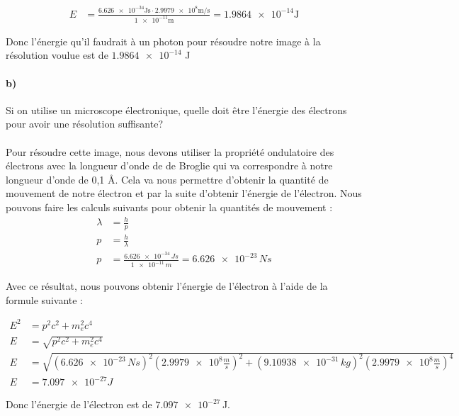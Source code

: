 \documentclass[11pt, letterpaper]{article}
\begin{document}
\begin{align*}
    E &= \frac{\num{6.626e-34} \text{Js} \cdot \num{2.9979e8}\text{m/s}}{\num{1e-11}\text{m}} = \num{1.9864e-14} \text{J}
\end{align*}

\begin{tcolorbox}[tommy]
Donc l'énergie qu'il faudrait à un photon pour résoudre notre image à la résolution voulue est de $\num{1,9864e-14}$ J
\end{tcolorbox}

\vspace{1cm}


\paragraph*{b)}
Si on utilise un microscope électronique, quelle doit être l'énergie des électrons pour avoir
une résolution suffisante?
\\\\
Pour résoudre cette image, nous devons utiliser la propriété ondulatoire des électrons avec la longueur d'onde de de Broglie qui va correspondre à notre longueur d'onde de 0,1 \AA. Cela va nous permettre d'obtenir la quantité de mouvement de notre électron et par la suite d'obtenir l'énergie de l'électron. Nous pouvons faire les calculs suivants pour obtenir la quantités de mouvement : 
\begin{align*}
    \lambda &= \frac{h}{p}
  \\  p &= \frac{h}{\lambda}
  \\ p &= \frac{\num{6.626e-34}\, Js}{\num{1e-11}\, m} = \num{6.626e-23}\, Ns
\end{align*}

Avec ce résultat, nous pouvons obtenir l'énergie de l'électron à l'aide de la formule suivante : 

\begin{align*}
    E^2 &= p^2c^2 + m_e^2c^4
\\    E &= \sqrt{p^2c^2 + m_e^2c^4}
\\ E&=\sqrt{(\num{6.626e-23}\, Ns)^2(\num{2.9979e8}\frac{m}{s})^2 + (\num{9.10938e-31}\, kg)^2(\num{2.9979e8}\frac{m}{s})^4}
\\E &= \num{7.097e-27} J
\end{align*}
\begin{tcolorbox}[tommy]
Donc l'énergie de l'électron est de $\num{7.097e-27}\,$J.
\end{tcolorbox}

\vspace{1cm}
\end{document}
